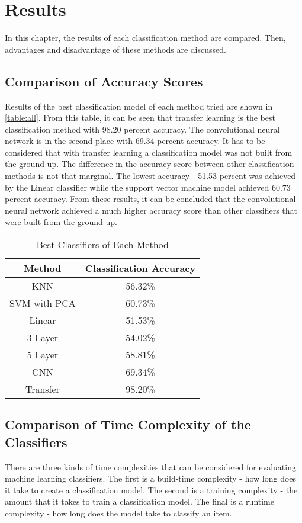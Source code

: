
\chapter{Results}
In this chapter, the results of each classification method are compared. Then, advantages and disadvantage of these methods are discussed.

\section{Comparison of Accuracy Scores}

Results of the best classification model of each method tried are shown in  \autoref{table:all}. From this table, it can be seen that transfer learning is the best classification method with 98.20 percent accuracy. The convolutional neural network is in the second place with 69.34 percent accuracy. It has to be considered that with transfer learning a classification model was not built from the ground up. The difference in the accuracy score between other classification methods is not that marginal. The lowest accuracy  - 51.53 percent was achieved by the Linear classifier while the support vector machine model achieved 60.73 percent accuracy.  From these results, it can be concluded that the convolutional neural network achieved a much higher accuracy score than other classifiers that were built from the ground up.

\begin{table}[h]
\begin{center}
\begin{tabular}{ |c|c| } 
 \hline
Method &  Classification Accuracy \\   \hline
KNN    &  56.32\% \\
SVM with PCA   & 60.73\% \\
Linear   &    51.53\%  \\
3 Layer    &   54.02\% \\
5 Layer    &  58.81\% \\
CNN & 69.34\% \\
Transfer  &  98.20\% \\

 \hline
\end{tabular}
\caption{Best Classifiers of Each Method}
\label{table:all}
\end{center}
\end{table}


\section{Comparison  of Time Complexity of the Classifiers}
There are three kinds of time complexities that can be considered for evaluating machine learning classifiers. The first is a build-time complexity - how long does it take to create a classification model. The second is a training complexity - the amount that it takes to train a classification model. The final is a runtime complexity - how long does the model take to classify an item. 

